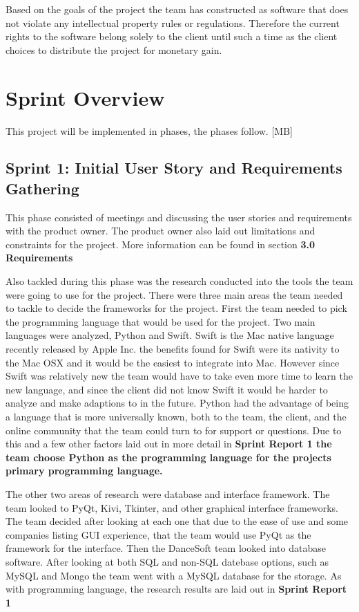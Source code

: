 Based on the goals of the project the team has constructed as software that does not violate any intellectual property rules or regulations. Therefore the current rights to the software belong solely to the client until such a time as the client choices to distribute the project for monetary gain.  

\section{Sprint  Overview}
This project will be implemented in phases, the phases follow. [MB]

\subsection{Sprint 1: Initial User Story and Requirements Gathering}
This phase consisted of meetings and discussing the user stories and requirements with the product owner. The product owner also laid out limitations and constraints for the project. More information can be found in section \bf 3.0 Requirements \rm

Also tackled during this phase was the research conducted into the tools the team were going to use for the project. There were three main areas the team needed to tackle to decide the frameworks for the project. First the team needed to pick the programming language that would be used for the project. Two main languages were analyzed, Python and Swift. Swift is the Mac native language recently released by Apple Inc. the benefits found for Swift were its nativity to the Mac OSX and it would be the easiest to integrate into Mac. However since Swift was relatively new the team would have to take even more time to learn the new language, and since the client did not know Swift it would be harder to analyze and make adaptions to in the future. Python had the advantage of being a language that is more universally known, both to the team, the client, and the online community that the team could turn to for support or questions. Due to this and a few other factors laid out in more detail in \bf Sprint Report 1 \rm the team choose Python as the programming language for the projects primary programming language.

The other two areas of research were database and interface framework. The team looked to PyQt, Kivi, Tkinter, and other graphical interface frameworks. The team decided after looking at each one that due to the ease of use and some companies listing GUI experience, that the team would use PyQt as the framework for the interface. Then the DanceSoft team looked into database software. After looking at both SQL and non-SQL datebase options, such as MySQL and Mongo the team went with a MySQL database for the storage. As with programming language, the research results are laid out in \bf Sprint Report 1 \rm   

